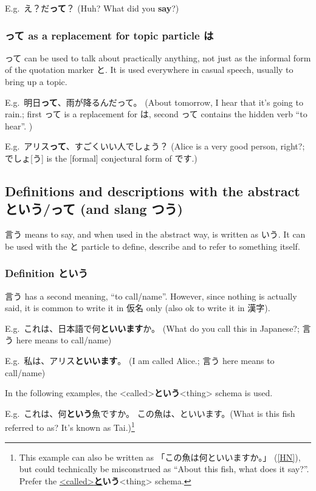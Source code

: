 \documentclass[../nihongo-gakushuu-kyouzai-grammar.tex]{subfiles}
\begin{document}
E.g.\ え？だ\textbf{って}？ (Huh? What did you \textbf{say}?)


\subsubsection{って as a replacement for topic particle は} \label{sec:tte-as-replacement-for-ha}

って can be used to talk about practically anything, not just as the informal form of the quotation marker と. It is used everywhere in casual speech, usually to bring up a topic.

E.g.\ 明日\textbf{って}、雨が降るんだって。 (About tomorrow, I hear that it's going to rain.; first って is a replacement for は, second って contains the hidden verb ``to hear''. )

E.g.\ アリス\textbf{って}、すごくいい人でしょう？ (Alice is a very good person, right?; でしょ[う] is the [formal] conjectural form of です.)


\subsection{Definitions and descriptions with the abstract という/って (and slang つう)} \label{sec:definitions-and-descriptions}

言う means to say, and when used in the abstract way, is written as いう. It can be used with the と particle to define, describe and to refer to something itself.


\subsubsection{Definition という} \label{sec:definition-toiu}
言う has a second meaning, ``to call/name''. However, since nothing is actually said, it is common to write it in 仮名 only (also ok to write it in 漢字).

E.g.\ これは、日本語で何\textbf{といいます}か。 (What do you call this in Japanese?; 言う here means to call/name)

E.g.\ 私は、アリス\textbf{といいます}。 (I am called Alice.; 言う here means to call/name)

In the following examples, the <called>\textbf{という}<thing> schema is used.

E.g.\ これは、何\textbf{という}魚ですか。 この魚は、といいます。(What is this fish referred to as? It's known as Tai.)\footnote{This example can also be written as 「この魚は何といいますか。」 (\href{https://ja.hinative.com/questions/16255453}{[HN]}), but could technically be misconstrued as ``About this fish, what does it say?''. Prefer the \ul{<called>\textbf{と}}\textbf{いう}<thing> schema.}
\end{document}
